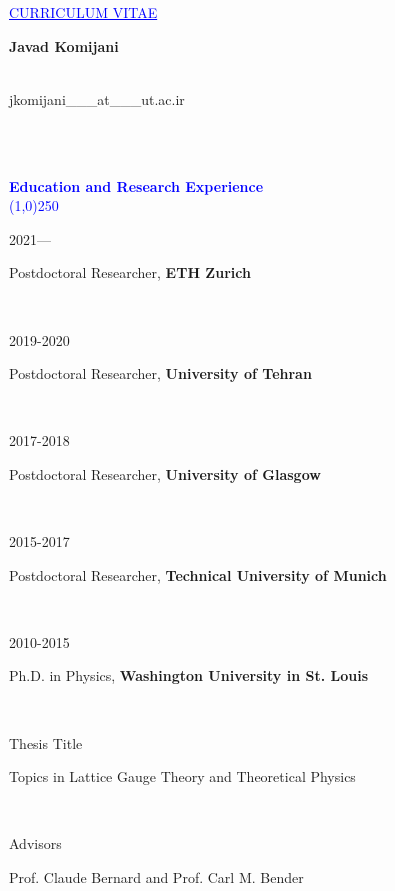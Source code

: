 \documentclass[a4paper,10pt]{article}
\newcommand{\miniLeft}[1]{\begin{minipage}[t]{0.15\textwidth} {#1} \end{minipage}}
\newcommand{\miniRight}[1]{\begin{minipage}[t]{0.85\textwidth} {#1} \end{minipage} \\}
\newcommand{\mini}[2]{\miniLeft{#1} \miniRight{#2}}
\newcommand{\Section}[1]{\linethickness{0.8mm} \textcolor{blue}{\\ {\textbf{#1}} \vspace{-3mm} \\  \line(1,0){250}} 
\\ }
\begin{document}

\vspace{-.1cm}
\par{\centering\textcolor{blue}{ \underline{CURRICULUM VITAE}\\}} %


\vspace{0.7cm} %


{\large \textbf{Javad Komijani}} \\

\vspace{-5mm}
\begin{minipage}[t]{0.40\textwidth} 
{\ }\\
{jkomijani\_\_\_at\_\_\_ut.ac.ir}
\end{minipage}
\begin{minipage}[t]{0.60\textwidth} 
\begin{flushright}
{ }
\end{flushright}
\end{minipage} \\

\vspace{0.5cm} %

\Section{Education and Research Experience}

\mini{2021---}{{Postdoctoral Researcher}, \textbf{ETH Zurich}}

\mini{2019-2020}{{Postdoctoral Researcher}, \textbf{University of Tehran}}

\mini{2017-2018}{{Postdoctoral Researcher}, \textbf{University of Glasgow}}

\mini{2015-2017}{{Postdoctoral Researcher}, \textbf{Technical University of Munich}}

\mini{2010-2015}{{Ph.D. in Physics}, \textbf{Washington University in St. Louis}}
\mini{Thesis Title}{Topics in Lattice Gauge Theory and Theoretical Physics}
\mini{Advisors}{Prof. Claude Bernard and Prof. Carl M. Bender}
\end{document}
